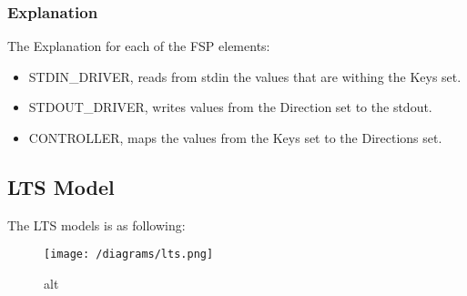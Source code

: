 \hypertarget{explanation}{%
\subsubsection{Explanation}\label{explanation}}

The Explanation for each of the FSP elements:

\begin{itemize}
\tightlist
\item
  STDIN\_DRIVER, reads from stdin the values that are withing the Keys
  set.
\item
  STDOUT\_DRIVER, writes values from the Direction set to the stdout.
\item
  CONTROLLER, maps the values from the Keys set to the Directions set.
\end{itemize}

\hypertarget{lts-model}{%
\subsection{LTS Model}\label{lts-model}}

The LTS models is as following:

\begin{figure}
\centering
\texttt{[image: /diagrams/lts.png]}
\caption{alt}
\end{figure}
